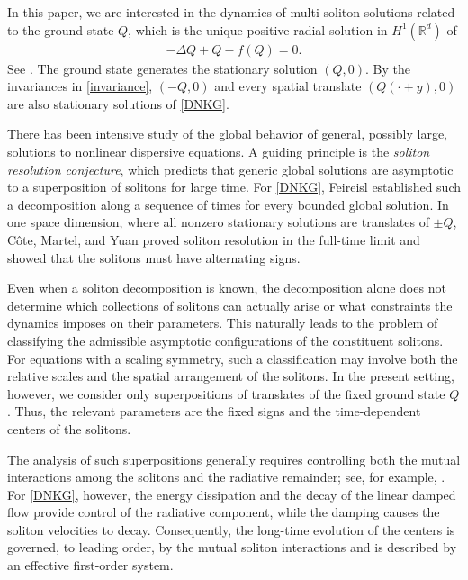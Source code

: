 \documentclass[10pt,a4paper]{amsart}
\numberwithin{equation}{section}
\begin{document}
In this paper, we are interested in the dynamics of multi-soliton solutions related to the ground state $Q$, which is the unique positive radial solution in $H^1(\mathbb{R}^d)$ of
\begin{align}\label{Qode}
-\Delta Q+Q-f(Q)=0.
\end{align}
See \cite{K2}. The ground state generates the stationary solution $(Q,0)$. By the invariances in \eqref{invariance}, $(-Q,0)$ and every spatial translate $(Q(\cdot+y),0)$ are also stationary solutions of \eqref{DNKG}.

There has been intensive study of the global behavior of general, possibly large, solutions to nonlinear dispersive equations. A guiding principle is the \textit{soliton resolution conjecture}, which predicts that generic global solutions are asymptotic to a superposition of solitons for large time. For \eqref{DNKG}, Feireisl \cite{F} established such a decomposition along a sequence of times for every bounded global solution. In one space dimension, where all nonzero stationary solutions are translates of $\pm Q$, C\^{o}te, Martel, and Yuan \cite{CMY} proved soliton resolution in the full-time limit and showed that the solitons must have alternating signs.

Even when a soliton decomposition is known, the decomposition alone does not determine which collections of solitons can actually arise or what constraints the dynamics imposes on their parameters. This naturally leads to the problem of classifying the admissible asymptotic configurations of the constituent solitons. For equations with a scaling symmetry, such a classification may involve both the relative scales and the spatial arrangement of the solitons. In the present setting, however, we consider only superpositions of translates of the fixed ground state $Q$. Thus, the relevant parameters are the fixed signs and the time-dependent centers of the solitons. 


The analysis of such superpositions generally requires controlling both the mutual interactions among the solitons and the radiative remainder; see, for example, \cite{CJ,IN}. For \eqref{DNKG}, however, the energy dissipation and the decay of the linear damped flow provide control of the radiative component, while the damping causes the soliton velocities to decay. Consequently, the long-time evolution of the centers is governed, to leading order, by the mutual soliton interactions and is described by an effective first-order system.
\end{document}
